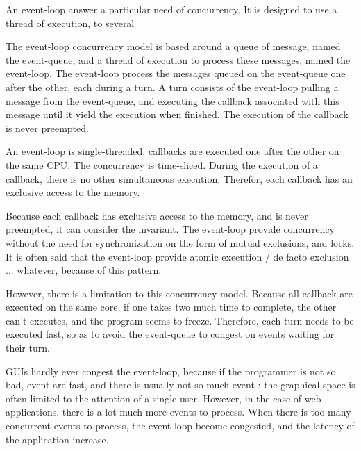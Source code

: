 
An event-loop answer a particular need of concurrency.
It is designed to use a thread of execution, to several 

The event-loop concurrency model is based around a queue of message, named the event-queue, and a thread of execution to process these messages, named the event-loop.
The event-loop process the messages queued on the event-queue one after the other, each during a turn.
A turn consists of the event-loop pulling a message from the event-queue, and executing the callback associated with this message until it yield the execution when finished.
The execution of the callback is never preempted.

An event-loop is single-threaded, callbacks are executed one after the other on the same CPU.
The concurrency is time-sliced.
During the execution of a callback, there is no other simultaneous execution.
Therefor, each callback has an exclusive access to the memory.

Because each callback has exclusive access to the memory, and is never preempted, it can consider the invariant.
The event-loop provide concurrency without the need for synchronization on the form of mutual exclusions, and locks.
It is often said that the event-loop provide atomic execution / de facto exclusion ... whatever, because of this pattern.

However, there is a limitation to this concurrency model.
Because all callback are executed on the same core, if one takes two much time to complete, the other can't executes, and the program seems to freeze.
Therefore, each turn needs to be executed fast, so as to avoid the event-queue to congest on events waiting for their turn.

GUIs hardly ever congest the event-loop, because if the programmer is not so bad, event are fast, and there is usually not so much event : the graphical space is often limited to the attention of a single user.
However, in the case of web applications, there is a lot much more events to process.
When there is too many concurrent events to process, the event-loop become congested, and the latency of the application increase.

